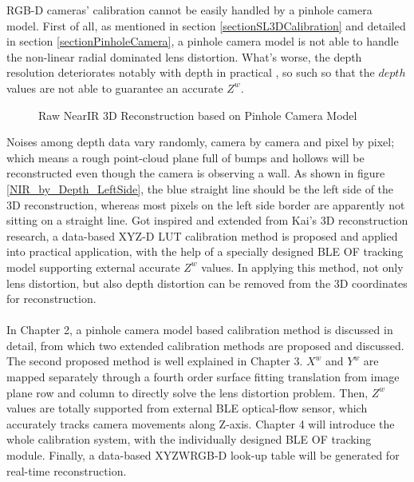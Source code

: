  RGB-D cameras' calibration cannot be easily handled by a pinhole camera model. First of all, as mentioned in section \ref{sectionSL3DCalibration} and detailed in section \ref{sectionPinholeCamera}, a pinhole camera model is not able to handle the non-linear radial dominated lens distortion. What's worse, the depth resolution deteriorates notably with depth in practical \cite{Krystof12}, so such so that the \(depth\) values are not able to guarantee an accurate  \(Z^{w}\).
%
 \begin{figure}[H]
{}
\caption{Raw NearIR 3D Reconstruction based on Pinhole Camera Model}
\label{NearIR}
\end{figure}%
%
\noindent
Noises among depth data vary randomly, camera by camera and pixel by pixel; which means a rough point-cloud plane full of bumps and hollows will be reconstructed even though the camera is observing a wall. As shown in figure \ref{NIR_by_Depth_LeftSide}, the blue straight line should be the left side of the 3D reconstruction, whereas most pixels on the left side border are apparently not sitting on a straight line.%
%
Got inspired and extended from Kai's 3D reconstruction research, a data-based XYZ-D LUT calibration method is proposed and applied into practical application, with the help of a specially designed BLE OF tracking model supporting external accurate \(Z^{w}\) values. In applying this method, not only lens distortion, but also depth distortion can be removed from the 3D coordinates for reconstruction.%
\\\\%
In Chapter 2, a pinhole camera model based calibration method is discussed in detail, from which two extended calibration methods are proposed and discussed. The second proposed method is well explained in Chapter 3. \(X^{w}\) and \(Y^{w}\) are mapped separately through a fourth order surface fitting translation from image plane row and column to directly solve the lens distortion problem. Then, \(Z^{w}\) values are totally supported from external BLE optical-flow sensor, which accurately tracks camera movements along Z-axis. Chapter 4 will introduce the whole calibration system, with the individually designed BLE OF tracking module. Finally, a data-based XYZWRGB-D look-up table will be generated for real-time reconstruction.




































